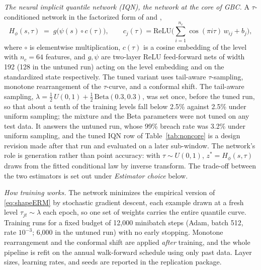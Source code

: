 \documentclass[11pt]{article}
\theoremstyle{remark}
\begin{document}
\emph{The neural implicit quantile network (IQN), the network at the core of GBC.} A
$\tau$-conditioned network
in the factorized form of \citet{dabney2018iqn} and
\citet{polson2023gbc},
\begin{equation}
H_\phi(s,\tau) \;=\; g\big(\psi(s)\circ c(\tau)\big),
\qquad
c_j(\tau) = \mathrm{ReLU}\Big(\textstyle\sum_{i=1}^{n_c}
\cos(\pi i \tau)\, w_{ij} + b_j\Big),
\label{eq:iqn}
\end{equation}
where $\circ$ is elementwise multiplication, $c(\tau)$ is a cosine embedding of the level with $n_c=64$ features, and $g,\psi$ are two-layer ReLU feed-forward nets of width 192 (128 in the untuned run) acting on the level embedding and on the standardized state respectively. The tuned variant uses tail-aware $\tau$-sampling, monotone rearrangement of the $\tau$-curve, and a conformal shift. The tail-aware sampling, $\lambda = \tfrac12\,U(0,1) + \tfrac12\,\mathrm{Beta}(0.3,0.3)$, was set once, before the tuned run, so that about a tenth of the training levels fall below 2.5\% against 2.5\% under uniform sampling; the mixture and the Beta parameters were not tuned on any test data. It answers the untuned run, whose 99\% breach rate was 3.2\% under uniform sampling, and the tuned IQN row of Table~\ref{tab:noncore} is a design revision made after that run and evaluated on a later sub-window. The network's role is generation rather than
point accuracy: with $\tau\sim U(0,1)$,
$z^{*} = H_\phi(s,\tau)$ draws from the fitted conditional law by
inverse transform. The trade-off between the two estimators is set out under \emph{Estimator choice} below.

\emph{How training works.} The network minimizes the empirical version
of \eqref{eq:shapeERM} by stochastic gradient descent, each example
drawn at a fresh level $\tau_{jt}\sim\lambda$ each epoch, so one set of
weights carries the entire quantile curve. Training runs for a fixed budget of 12{,}000 minibatch steps (Adam, batch 512, rate $10^{-3}$; 6{,}000 in the untuned run) with no early stopping. Monotone rearrangement and the conformal shift
are applied \emph{after} training, and the whole pipeline is refit on
the annual walk-forward schedule using only past data. Layer sizes,
learning rates, and seeds are reported in the replication package.
\end{document}

